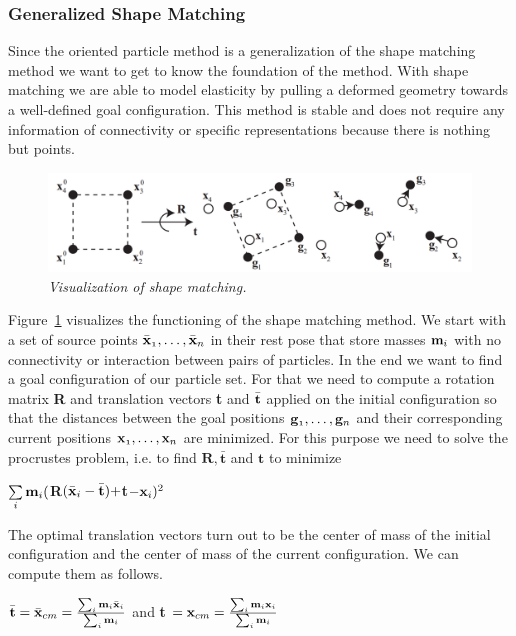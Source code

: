 \documentclass[
	11pt, 
	DIV10,
	a4paper, 
	oneside, 
	headings=normal, 
	captions=tableheading,
	final, 
	numbers=noenddot
]{scrartcl}
\begin{document}
\subsubsection{Generalized Shape Matching}
	Since the oriented particle method is a generalization of the shape matching method we want to get to know the foundation of the method. With shape matching we are able to model elasticity by pulling a deformed geometry towards a well-defined goal configuration. This method is stable and does not require any information of connectivity or specific representations because there is nothing but points.\cite{11}
	\begin{figure}[H]
		\centering
		\includegraphics[scale = 0.36]{ShapeMatching.PNG}
		\caption[caption]{\label{ShapeMatching} \textit{Visualization of shape matching.}\footnotemark[1]}
	\end{figure}
	
	\noindent Figure~\ref{ShapeMatching} visualizes the functioning of the shape matching method. We start with a set of source points $\mathnormal{\mathbf{\bar{x}}_1,\dots,\mathbf{\bar{x}}_n}$ in their rest pose that store masses $\mathnormal{\mathbf{m}_i}$ with no connectivity or interaction between pairs of particles. In the end we want to find a goal configuration of our particle set. For that we need to compute a rotation matrix \textbf{R} and translation vectors \textbf{t} and $\mathnormal{\mathbf{\bar{t}}}$ applied on the initial configuration so that the distances between the goal positions $\mathnormal{\mathbf{g}_1,\dots,\mathbf{g}_n}$ and their corresponding current positions $\mathnormal{\mathbf{x}_1,\dots,\mathbf{x}_n}$ are minimized.\cite{11}
	For this purpose we need to solve the procrustes problem, i.e. to find $\mathbf{R}, \mathbf{\bar{t}}$ and $ \mathbf{t}$ to minimize
	\begin{center}
		$\sum\limits_{i}\mathnormal{\mathbf{m}_i}($\textbf{R}$(\mathnormal{\mathbf{\bar{x}}_i}-\mathnormal{\mathbf{\bar{t}}})+$\textbf{t}$-\mathnormal{\mathbf{x}_i})^2$
	\end{center}
	The optimal translation vectors turn out to be the center of mass of the initial configuration and the center of mass of the current configuration.\cite{11} We can compute them as follows.
	\begin{center}
		 $\mathnormal{\mathbf{\bar{t}}}=\mathnormal{\mathbf{\bar{x}}_{cm}}=\frac{\sum_{i}\mathnormal{\mathbf{m}_i} \mathnormal{\mathbf{\bar{x}}_i}}{\sum_{i}\mathnormal{\mathbf{m}_i}}$ and \textbf{t} $=\mathnormal{\mathbf{x}_{cm}}=\frac{\sum_{i}\mathnormal{\mathbf{m}_i \mathbf{x}_i}}{\sum_{i}\mathnormal{\mathbf{m}_i}}$
	\end{center}
	
\end{document}

